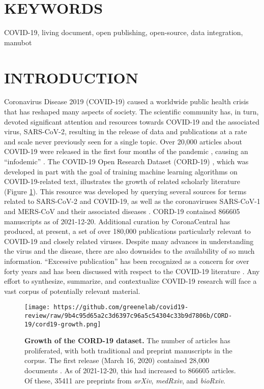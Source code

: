 \documentclass[twocolumn]{ceurart}
\begin{document}
\hypertarget{keywords}{%
\section*{KEYWORDS}\label{keywords}}

COVID-19, living document, open publishing, open-source, data integration, manubot

\hypertarget{introduction}{%
\section{INTRODUCTION}\label{introduction}}

Coronavirus Disease 2019 (COVID-19) caused a worldwide public health crisis that has reshaped many aspects of society.
The scientific community has, in turn, devoted significant attention and resources towards COVID-19 and the associated virus, SARS-CoV-2, resulting in the release of data and publications at a rate and scale never previously seen for a single topic.
Over 20,000 articles about COVID-19 were released in the first four months of the pandemic \citep{7ub6VM4Z}, causing an ``infodemic'' \citep{7ub6VM4Z, nnfOazAC}.
The COVID-19 Open Research Dataset (CORD-19) \citep{CiOwklc6}, which was developed in part with the goal of training machine learning algorithms on COVID-19-related text, illustrates the growth of related scholarly literature (Figure \ref{fig:cord19-growth}).
This resource was developed by querying several sources for terms related to SARS-CoV-2 and COVID-19, as well as the coronaviruses SARS-CoV-1 and MERS-CoV and their associated diseases \citep{CiOwklc6}.
CORD-19 contained 866605 manuscripts as of 2021-12-20.
Additional curation by CoronaCentral \citep{Ybg667S0} has produced, at present, a set of over 180,000 publications particularly relevant to COVID-19 and closely related viruses.
Despite many advances in understanding the virus and the disease, there are also downsides to the availability of so much information.
``Excessive publication'' has been recognized as a concern for over forty years \citep{DfSr1Ohc} and has been discussed with respect to the COVID-19 literature \citep{dUvvJvv6}.
Any effort to synthesize, summarize, and contextualize COVID-19 research will face a vast corpus of potentially relevant material.

\begin{figure}
\hypertarget{fig:cord19-growth}{%
\centering
\texttt{[image: https://github.com/greenelab/covid19-review/raw/9b4c95d65a2c3d6397c96a5c54304c33b9d7806b/CORD-19/cord19-growth.png]}
\caption{\textbf{Growth of the CORD-19 dataset.}
The number of articles has proliferated, with both traditional and preprint manuscripts in the corpus.
The first release (March 16, 2020) contained 28,000 documents \citep{CiOwklc6}.
As of 2021-12-20, this had increased to 866605 articles.
Of these, 35411 are preprints from \emph{arXiv}, \emph{medRxiv}, and \emph{bioRxiv}.}\label{fig:cord19-growth}
}
\end{figure}
\end{document}

